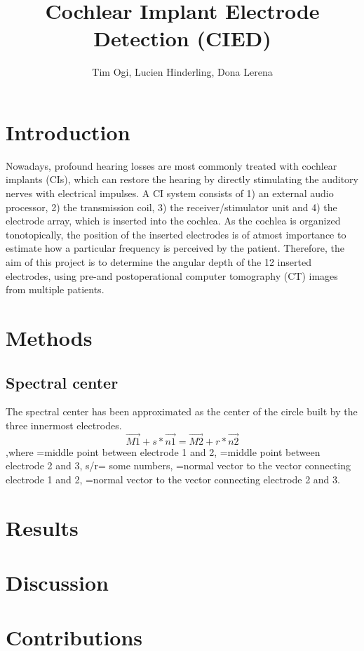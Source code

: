 \documentclass[a4paper, 12pt]{report}
\begin{document}
\title{Cochlear Implant Electrode Detection (CIED)}
\author{Tim Ogi, Lucien Hinderling, Dona Lerena}
\maketitle

\section{Introduction}
Nowadays, profound hearing losses are most commonly treated with cochlear implants (CIs), which can restore the hearing by directly stimulating the auditory nerves with electrical impulses. A CI system consists of 1) an external audio processor, 2) the transmission coil, 3) the receiver/stimulator unit and 4) the electrode array, which is inserted into the cochlea. As the cochlea is organized tonotopically, the position of the inserted electrodes is of atmost importance to estimate how a particular frequency is perceived by the patient. Therefore, the aim of this project is to determine the angular depth of the 12 inserted electrodes, using pre-and postoperational computer tomography (CT) images from multiple patients.


\section{Methods}
\subsection{Spectral center}
The spectral center has been approximated as the center of the circle built by the three innermost electrodes.
$$\overrightarrow{M1}+s*\overrightarrow{n1}=\overrightarrow{M2}+r*\overrightarrow{n2}$$ ,where =middle point between electrode 1 and 2, =middle point between electrode 2 and 3, s/r= some numbers, =normal vector to the vector connecting electrode 1 and 2, =normal vector to the vector connecting electrode 2 and 3.


\section{Results}

\section{Discussion}

\section{Contributions}
\end{document}
